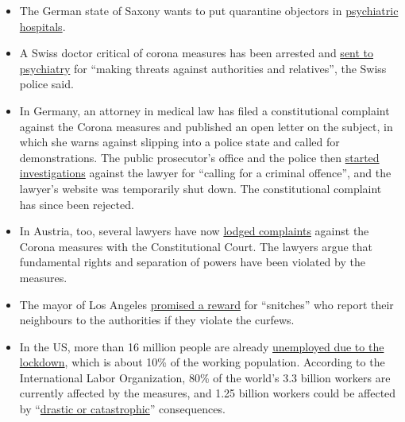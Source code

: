 \begin{itemize}
{  drones} in ``corona missions'', specifically to search for prohibited
  groups of people.
\item
  The German state of Saxony wants to put quarantine objectors in
  \href{https://www.welt.de/politik/deutschland/article207198029/Coronavirus-Sachsen-will-Quarantaene-Verweigerer-in-Psychiatrien-sperren.html}{psychiatric
  hospitals}.
\item
  A Swiss doctor critical of corona measures has been arrested and
  \href{https://www.srf.ch/news/regional/aargau-solothurn/festnahme-von-corona-kritiker-verschwoerung-oder-normale-intervention-der-aargauer-behoerden}{sent
  to psychiatry} for ``making threats against authorities and
  relatives'', the Swiss police said.
\item
  In Germany, an attorney in medical law has filed a constitutional
  complaint against the Corona measures and published an open letter on
  the subject, in which she warns against slipping into a police state
  and called for demonstrations. The public prosecutor's office and the
  police then
  \href{https://www.morgenweb.de/mannheimer-morgen_artikel,-coronavirus-aufruf-zu-straftaten-ermittlungen-gegen-heidelberger-rechtsanwaeltin-_arid,1627078.html}{started
  investigations} against the lawyer for ``calling for a criminal
  offence'', and the lawyer's website was temporarily shut down. The
  constitutional complaint has since been rejected.
\item
  In Austria, too, several lawyers have now
  \href{https://wien.orf.at/stories/3043172/}{lodged complaints} against
  the Corona measures with the Constitutional Court. The lawyers argue
  that fundamental rights and separation of powers have been violated by
  the measures.
\item
  The mayor of Los Angeles
  \href{https://townhall.com/tipsheet/bethbaumann/2020/04/04/la-mayor-garcetti-says-snitches-get-rewards-for-ratting-out-their-neighbors-n2566348}{promised
  a reward} for ``snitches'' who report their neighbours to the
  authorities if they violate the curfews.
\item
  In the US, more than 16 million people are already
  \href{https://www.nytimes.com/2020/04/09/us/coronavirus-us-news.html}{unemployed
  due to the lockdown}, which is about 10\% of the working population.
  According to the International Labor Organization, 80\% of the world's
  3.3 billion workers are currently affected by the measures, and 1.25
  billion workers could be affected by
  ``\href{https://www.ilo.org/global/about-the-ilo/newsroom/news/WCMS_740893/lang--en/index.htm}{drastic
  or catastrophic}'' consequences.
\end{itemize}

